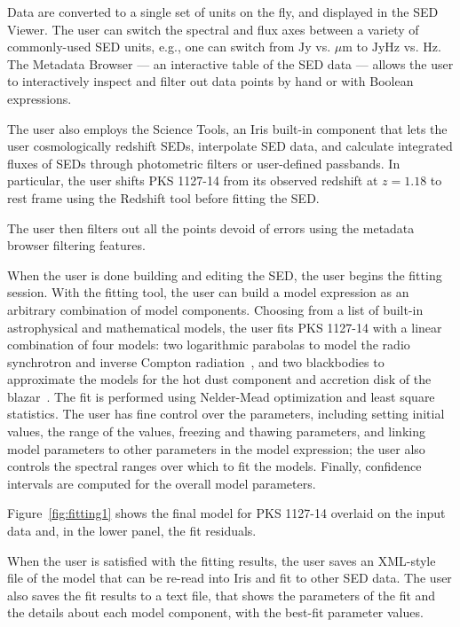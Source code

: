 \documentclass[preprint,authoryear,5p]{elsarticle}
\begin{document}
Data are converted to a single set of units on the fly, and displayed in the SED
Viewer. The user can switch the spectral and flux axes between a variety of
commonly-used SED units, e.g., one can switch from $\mathrm{Jy}$ vs.
${\mu}\mathrm{m}$ to $\mathrm{Jy}\mathrm{Hz}$ vs. $\mathrm{Hz}$. The Metadata
Browser --- an interactive table of the SED data --- allows the user to
interactively inspect and filter out data points by hand or with Boolean
expressions.

\begin{sloppypar}
The user also employs the Science Tools, an Iris built-in component that
lets the user cosmologically redshift SEDs, interpolate SED data, and calculate 
integrated fluxes of SEDs
through photometric filters or user-defined passbands. In particular, the user
shifts PKS 1127-14 from its observed redshift at $z=1.18$ to rest frame using
the Redshift tool before fitting the SED.
\end{sloppypar}

The user then filters out all the points devoid of errors using the metadata browser
filtering features.

When the user is done building and editing the SED, the user begins the fitting
session. With the fitting tool, the user can build a model expression as an
arbitrary combination of model components. Choosing from a list of built-in astrophysical
and mathematical models, the user fits PKS 1127-14 with a linear
combination of four models: two logarithmic parabolas to model the radio
synchrotron and inverse Compton radiation~\citep{2006A&A...448..861M,2009A&A...501..879T}, 
and two blackbodies to approximate the models for the hot dust component and 
accretion disk of the blazar~\citep{2002ApJ...575..667D}. The fit
is performed using Nelder-Mead optimization and least square statistics. The user
has fine control over the parameters, including setting initial values, the
range of the values, freezing and thawing parameters, and linking model
parameters to other parameters in the model expression; the user also controls the 
spectral ranges over which to fit the models. Finally, confidence intervals are computed 
for the overall model parameters.

Figure~\ref{fig:fitting1} shows the final model for PKS 1127-14 overlaid on the
input data and, in the lower panel, the fit residuals.

When the user is satisfied with the fitting results, the user saves an XML-style file
of the model that can be re-read into Iris and fit to other SED data. The user also
saves the fit results to a text file, that shows the parameters of the fit and
the details about each model component, with the best-fit parameter values.
\end{document}
